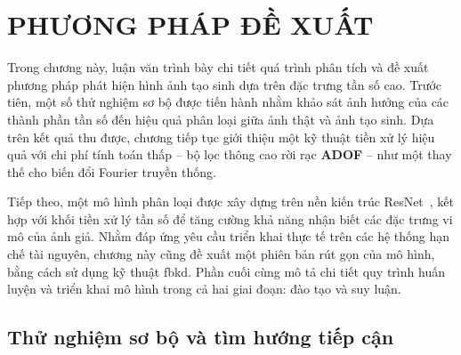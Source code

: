 \chapter{PHƯƠNG PHÁP ĐỀ XUẤT}
\label{Chapter3}
%
Trong chương này, luận văn trình bày chi tiết quá trình phân tích và đề xuất phương pháp phát hiện hình ảnh tạo sinh dựa trên đặc trưng tần số cao. Trước tiên, một số thử nghiệm sơ bộ được tiến hành nhằm khảo sát ảnh hưởng của các thành phần tần số đến hiệu quả phân loại giữa ảnh thật và ảnh tạo sinh. Dựa trên kết quả thu được, chương tiếp tục giới thiệu một kỹ thuật tiền xử lý hiệu quả với chi phí tính toán thấp – bộ lọc thông cao rời rạc \textbf{ADOF} – như một thay thế cho biến đổi Fourier truyền thống.

Tiếp theo, một mô hình phân loại được xây dựng trên nền kiến trúc ResNet~\cite{He2015DeepRL}, kết hợp với khối tiền xử lý tần số để tăng cường khả năng nhận biết các đặc trưng vi mô của ảnh giả. Nhằm đáp ứng yêu cầu triển khai thực tế trên các hệ thống hạn chế tài nguyên, chương này cũng đề xuất một phiên bản rút gọn của mô hình, bằng cách sử dụng kỹ thuật \gls{fbkd}. Phần cuối cùng mô tả chi tiết quy trình huấn luyện và triển khai mô hình trong cả hai giai đoạn: đào tạo và suy luận.
%
\section{Thử nghiệm sơ bộ và tìm hướng tiếp cận}
%
